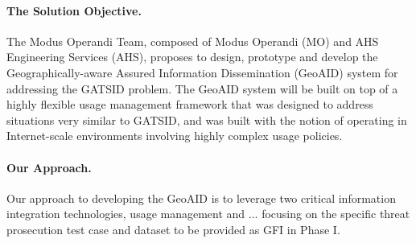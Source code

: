 \documentclass{sbir}
\begin{document}
\paragraph{The Solution Objective.} The Modus Operandi Team, composed of Modus Operandi (MO) and AHS Engineering Services (AHS), proposes to design, prototype and develop the Geographically-aware Assured Information Dissemination (GeoAID) system for addressing the GATSID problem.  The GeoAID system will be built on top of a highly flexible usage management framework that was designed to address situations very similar to GATSID, and was built with the notion of operating in Internet-scale environments involving highly complex usage policies.

\paragraph{Our Approach.} Our approach to developing the GeoAID is to leverage two critical information integration technologies, usage management and ...  focusing on the specific threat prosecution test case and dataset to be provided as GFI in Phase I.
\end{document}

